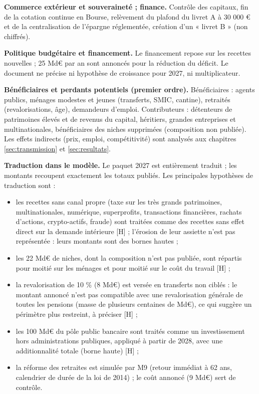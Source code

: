 \documentclass[
  11pt,
  11pt,
  a4paper,
  openany]{book}
\providecommand{\tightlist}{%
  \setlength{\itemsep}{0pt}\setlength{\parskip}{0pt}}
\begin{document}
\textbf{Commerce extérieur et souveraineté ; finance.} Contrôle des
capitaux, fin de la cotation continue en Bourse, relèvement du plafond
du livret A à 30 000 € et de la centralisation de l'épargne réglementée,
création d'un « livret B » (non chiffrés).

\textbf{Politique budgétaire et financement.} Le financement repose sur
les recettes nouvelles ; 25 Md€ par an sont annoncés pour la réduction
du déficit. Le document ne précise ni hypothèse de croissance pour 2027,
ni multiplicateur.

\textbf{Bénéficiaires et perdants potentiels (premier ordre).}
Bénéficiaires : agents publics, ménages modestes et jeunes (transferts,
SMIC, cantine), retraités (revalorisations, âge), demandeurs d'emploi.
Contributeurs : détenteurs de patrimoines élevés et de revenus du
capital, héritiers, grandes entreprises et multinationales,
bénéficiaires des niches supprimées (composition non publiée). Les
effets indirects (prix, emploi, compétitivité) sont analysés aux
chapitres \ref{sec:transmission} et \ref{sec:resultats}.

\textbf{Traduction dans le modèle.} Le paquet 2027 est entièrement
traduit ; les montants recoupent exactement les totaux publiés. Les
principales hypothèses de traduction sont :

\begin{itemize}
\tightlist
\item
  les recettes sans canal propre (taxe sur les très grands patrimoines,
  multinationales, numérique, superprofits, transactions financières,
  rachats d'actions, crypto-actifs, fraude) sont traitées comme des
  recettes sans effet direct sur la demande intérieure {[}H{]} ;
  l'érosion de leur assiette n'est pas représentée : leurs montants sont
  des bornes hautes ;
\item
  les 22 Md€ de niches, dont la composition n'est pas publiée, sont
  répartis pour moitié sur les ménages et pour moitié sur le coût du
  travail {[}H{]} ;
\item
  la revalorisation de 10 \% (8 Md€) est versée en transferts non ciblés
  : le montant annoncé n'est pas compatible avec une revalorisation
  générale de toutes les pensions (masse de plusieurs centaines de Md€),
  ce qui suggère un périmètre plus restreint, à préciser {[}H{]} ;
\item
  les 100 Md€ du pôle public bancaire sont traités comme un
  investissement hors administrations publiques, appliqué à partir de
  2028, avec une additionnalité totale (borne haute) {[}H{]} ;
\item
  la réforme des retraites est simulée par M9 (retour immédiat à 62 ans,
  calendrier de durée de la loi de 2014) ; le coût annoncé (9 Md€) sert
  de contrôle.
\end{itemize}
\end{document}
